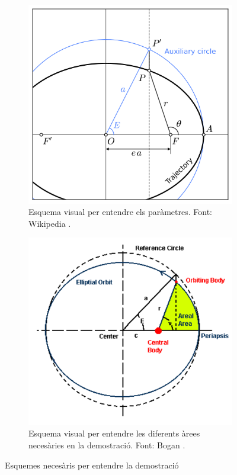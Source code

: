 \documentclass[a4paper, 11pt]{article}
\begin{document}
\begin{figure}[h!]
    \centering
    \begin{subfigure}{0.45\textwidth}
        \centering
        \includegraphics[width=\textwidth]{images/esquema_orbites.png}
        \caption{Esquema visual per entendre els paràmetres. Font: Wikipedia \cite{E_ANOMALY}.}
    \end{subfigure}
    \hspace{0.05\textwidth}
    \begin{subfigure}{0.45\textwidth}
        \centering
        \includegraphics[width=\textwidth]{images/esquema_posicio.png}
        \caption{Esquema visual per entendre les diferents àrees necesàries en la demostració. Font: Bogan \cite{M_EQ}.}
    \end{subfigure}
    \caption{Esquemes necesàris per entendre la demostració}
    \label{fig:esquema_orbites}
\end{figure}
\end{document}
